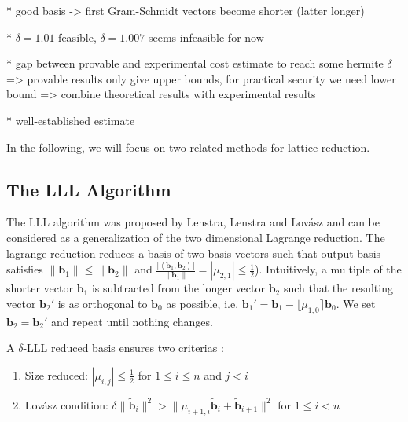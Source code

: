  * good basis -> first Gram-Schmidt vectors become shorter (latter longer)

  * $\delta = 1.01$ feasible, $\delta = 1.007$ seems infeasible for now

  * gap between provable and experimental cost estimate to reach some hermite $\delta$ => provable results only give upper bounds, for practical security we need lower bound => combine theoretical results with experimental results

  * well-established estimate \cite{LP11}

In the following, we will focus on two related methods for lattice reduction. %

\subsection{The LLL Algorithm}
The LLL algorithm was proposed by Lenstra, Lenstra and Lovász \cite{LLL82} and can be considered as a generalization of the two dimensional Lagrange reduction. The lagrange reduction reduces a basis of two basis vectors such that output basis satisfies $\|\mathbf{b}_1\| \leq \|\mathbf{b}_2\|$ and $\frac{|\left\langle\mathbf{b}_1, \mathbf{b}_2\right\rangle|}{\|\mathbf{b}_1\|} = |\mu_{2,1}| \leq \frac{1}{2}$). Intuitively, a multiple of the shorter vector $\mathbf{b}_1$ is subtracted from the longer vector $\mathbf{b}_2$ such that the resulting vector $\mathbf{b}_2'$ is as orthogonal to $\mathbf{b}_0$ as possible, i.e.  $\mathbf{b}_1' =  \mathbf{b}_1 - \lfloor\mu_{1,0}\rceil \mathbf{b}_0$. We set $\mathbf{b}_2 = \mathbf{b}_2'$ and repeat until nothing changes. 

A $\delta$-LLL reduced basis ensures two criterias \cite{LLL82}:
\begin{enumerate}
  \item Size reduced: $|\mu_{i,j}| \leq \frac{1}{2}$ for $1\leq i \leq n$ and $j < i$ \label{size-red}
  \item Lovász condition: $\delta \| \tilde{\mathbf{b}}_i \|^2 > \| \mu_{i+1, i} \tilde{\mathbf{b}}_i + \tilde{\mathbf{b}}_{i+1} \|^2$ for $1\leq i < n$
\end{enumerate}

